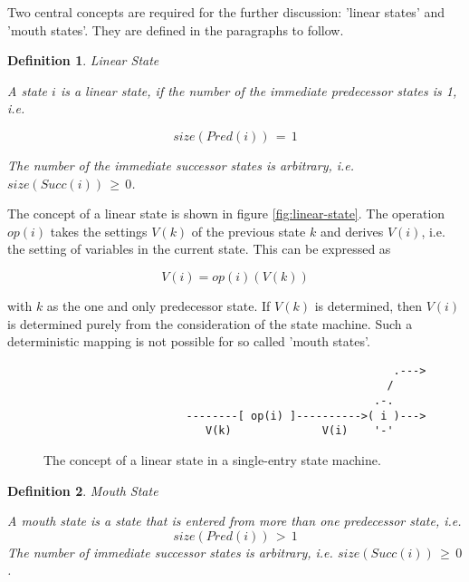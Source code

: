 \documentclass[12pt,a4paper]{scrartcl}
\newtheorem{definition}{Definition}
\begin{document}
Two central concepts are required for the further discussion: 'linear states'
and 'mouth states'.  They are defined in the paragraphs to follow. 

\begin{definition}
Linear State

A state $i$ is a linear state, if the number of the immediate predecessor states is
1, i.e. 

\begin{equation}
                           size(Pred(i))\,=\,1
\end{equation}

The number of the immediate successor states is arbitrary, i.e.
$size(Succ(i))\,\ge\,0$.

\end{definition}

The concept of a linear state is shown in figure \eqref{fig:linear-state}. The
operation $op(i)$ takes the settings $V(k)$ of the previous state $k$
and derives $V(i)$, i.e.  the setting of variables in the current state. This
can be expressed as 

\begin{equation} \label{eq:accumulation}
            V(i) = op(i)(V(k))                                         
\end{equation}

with $k$ as the one and only predecessor state. If $V(k)$ is determined, then
$V(i)$ is determined purely from the consideration of the state machine. Such a
deterministic mapping is not possible for so called 'mouth states'.

\begin{figure}[htbp] \leavevmode \label{fig:linear-state}
\begin{verbatim}
                                                      .---> 
                                                     /
                                                   .-.
                      --------[ op(i) ]---------->( i )---> 
                         V(k)              V(i)    '-'

\end{verbatim}
\caption{The concept of a linear state in a single-entry state machine.}
\end{figure}

\begin{definition}
Mouth State

A mouth state is a state that is entered from more than one predecessor 
state, i.e.
\begin{equation}
                           size(Pred(i))\,>\,1
\end{equation}
The number of immediate successor states is arbitrary, i.e.
$size(Succ(i))\,\ge\,0$.

\end{definition}
    
\end{document}
